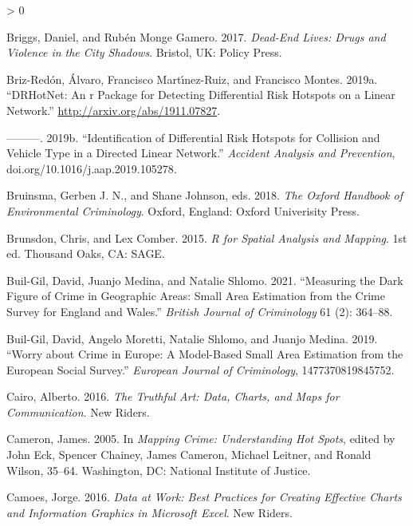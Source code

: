 \documentclass[
  krantz2]{krantz}
\newlength{\cslhangindent}
\newenvironment{CSLReferences}[2] %
 {%
  \setlength{\parindent}{0pt}
  \ifodd #1 \everypar{\setlength{\hangindent}{\cslhangindent}}\ignorespaces\fi
  \ifnum #2 > 0
  \setlength{\parskip}{#2\baselineskip}
  \fi
 }%
 {}
\begin{document}
\begin{CSLReferences}{1}{0}
\leavevmode\hypertarget{ref-Briggs_2017}{}%
Briggs, Daniel, and Rubén Monge Gamero. 2017. \emph{Dead-End Lives: Drugs and Violence in the City Shadows}. Bristol, UK: Policy Press.

\leavevmode\hypertarget{ref-BrizRedon_2019a}{}%
Briz-Redón, Álvaro, Francisco Martı́nez-Ruiz, and Francisco Montes. 2019a. {``DRHotNet: An r Package for Detecting Differential Risk Hotspots on a Linear Network.''} \url{http://arxiv.org/abs/1911.07827}.

\leavevmode\hypertarget{ref-BrizRedon_2019b}{}%
---------. 2019b. {``Identification of Differential Risk Hotspots for Collision and Vehicle Type in a Directed Linear Network.''} \emph{Accident Analysis and Prevention}, doi.org/10.1016/j.aap.2019.105278.

\leavevmode\hypertarget{ref-Bruinsma_2018}{}%
Bruinsma, Gerben J. N., and Shane Johnson, eds. 2018. \emph{The Oxford Handbook of Environmental Criminology}. Oxford, England: Oxford Univerisity Press.

\leavevmode\hypertarget{ref-Brunsdon_2015}{}%
Brunsdon, Chris, and Lex Comber. 2015. \emph{R for Spatial Analysis and Mapping}. 1st ed. Thousand Oaks, CA: SAGE.

\leavevmode\hypertarget{ref-Buil-Gil_2021}{}%
Buil-Gil, David, Juanjo Medina, and Natalie Shlomo. 2021. {``Measuring the Dark Figure of Crime in Geographic Areas: Small Area Estimation from the Crime Survey for England and Wales.''} \emph{British Journal of Criminology} 61 (2): 364--88.

\leavevmode\hypertarget{ref-Buil_2019}{}%
Buil-Gil, David, Angelo Moretti, Natalie Shlomo, and Juanjo Medina. 2019. {``Worry about Crime in Europe: A Model-Based Small Area Estimation from the European Social Survey.''} \emph{European Journal of Criminology}, 1477370819845752.

\leavevmode\hypertarget{ref-Cairo_2016}{}%
Cairo, Alberto. 2016. \emph{The Truthful Art: Data, Charts, and Maps for Communication}. New Riders.

\leavevmode\hypertarget{ref-Cameron_2005}{}%
Cameron, James. 2005. In \emph{Mapping Crime: Understanding Hot Spots}, edited by John Eck, Spencer Chainey, James Cameron, Michael Leitner, and Ronald Wilson, 35--64. Washington, DC: National Institute of Justice.

\leavevmode\hypertarget{ref-Camoes_2016}{}%
Camoes, Jorge. 2016. \emph{Data at Work: Best Practices for Creating Effective Charts and Information Graphics in Microsoft Excel}. New Riders.


\end{CSLReferences}
\end{document}
